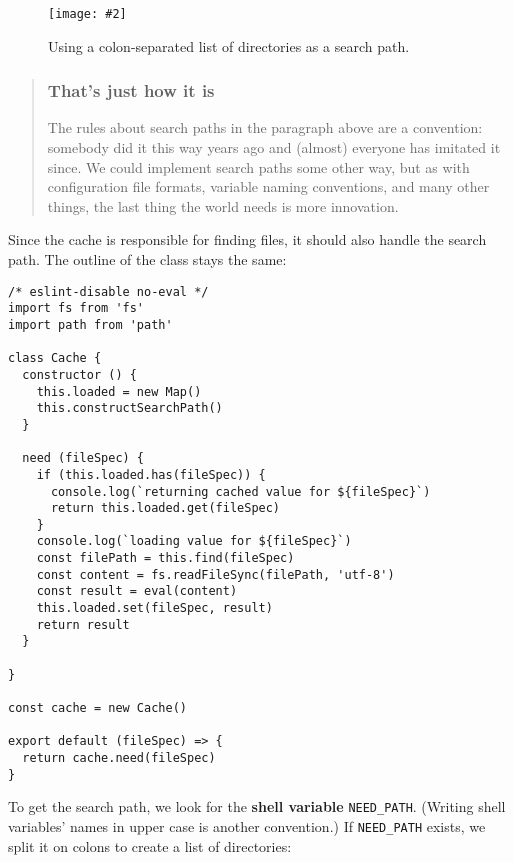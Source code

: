 \documentclass[krantzl]{krantz}
\newcommand{\figpdf}[4]{\begin{figure}%
\centering%
\texttt{[image: \#2]}%
\caption{#3}%
\label{#1}%
\end{figure}}
\newcommand{\glossref}[1]{\textbf{#1}}
\newenvironment{callout}{\savenotes\begin{tBox}\begin{quotation}\toggletrue{inbox}\renewcommand{\thempfootnote}{\arabic{footnote}}}{\end{quotation}\vspace{\baselineskip}\end{tBox}\togglefalse{inbox}\spewnotes}
\begin{document}
\figpdf{file-interpolator-search-path}{./file-interpolator/search-path.pdf}{Using a colon-separated list of directories as a search path.}{0.6}

\begin{callout}


\subsubsection*{That's just how it is}


The rules about search paths in the paragraph above are a convention:
somebody did it this way years ago
and (almost) everyone has imitated it since.
We could implement search paths some other way,
but as with configuration file formats,
variable naming conventions,
and many other things,
the last thing the world needs is more innovation.

\end{callout}


Since the cache is responsible for finding files,
it should also handle the search path.
The outline of the class stays the same:


\begin{lstlisting}[frame=single,frameround=tttt]
/* eslint-disable no-eval */
import fs from 'fs'
import path from 'path'

class Cache {
  constructor () {
    this.loaded = new Map()
    this.constructSearchPath()
  }

  need (fileSpec) {
    if (this.loaded.has(fileSpec)) {
      console.log(`returning cached value for ${fileSpec}`)
      return this.loaded.get(fileSpec)
    }
    console.log(`loading value for ${fileSpec}`)
    const filePath = this.find(fileSpec)
    const content = fs.readFileSync(filePath, 'utf-8')
    const result = eval(content)
    this.loaded.set(fileSpec, result)
    return result
  }

}

const cache = new Cache()

export default (fileSpec) => {
  return cache.need(fileSpec)
}
\end{lstlisting}



To get the search path,
we look for the \glossref{shell variable} \texttt{NEED\_PATH}.
(Writing shell variables' names in upper case is another convention.)
If \texttt{NEED\_PATH} exists,
we split it on colons to create a list of directories:
\end{document}
